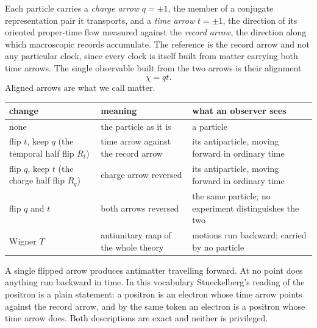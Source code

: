 \documentclass[11pt]{article}
\theoremstyle{definition}\newtheorem{definition}[theorem]{Definition}
\theoremstyle{remark}\newtheorem{remark}[theorem]{Remark}\newtheorem{conjecture}[theorem]{Conjecture}
\begin{document}
Each particle carries a \emph{charge arrow} $q=\pm1$, the member of a conjugate representation pair it transports, and a \emph{time arrow} $t=\pm1$, the direction of its oriented proper-time flow measured against the \emph{record arrow}, the direction along which macroscopic records accumulate. The reference is the record arrow and not any particular clock, since every clock is itself built from matter carrying both time arrows. The single observable built from the two arrows is their alignment
\begin{equation}\label{eq:alignment}
 \boxed{\chi=qt.}
\end{equation}
Aligned arrows are what we call matter.
\begin{center}
\begin{tabular}{@{}>{\raggedright\arraybackslash}p{}>{\raggedright\arraybackslash}p{}>{\raggedright\arraybackslash}p{}@{}}
\toprule
change & meaning & what an observer sees\\
\midrule
none & the particle as it is & a particle\\
flip $t$, keep $q$ (the temporal half flip $R_t$) & time arrow against the record arrow & its antiparticle, moving forward in ordinary time\\
flip $q$, keep $t$ (the charge half flip $R_q$) & charge arrow reversed & its antiparticle, moving forward in ordinary time\\
flip $q$ and $t$ & both arrows reversed & the same particle; no experiment distinguishes the two\\
Wigner $T$ & antiunitary map of the whole theory & motions run backward; carried by no particle\\
\bottomrule
\end{tabular}
\end{center}
A single flipped arrow produces antimatter travelling forward. At no point does anything run backward in time. In this vocabulary Stueckelberg's reading of the positron is a plain statement: a positron is an electron whose time arrow points against the record arrow, and by the same token an electron is a positron whose time arrow does. Both descriptions are exact and neither is privileged.
\end{document}
